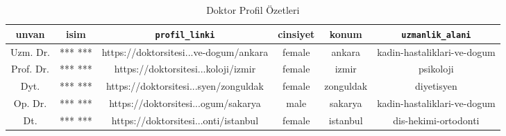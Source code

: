 \begin{table*}
\begin{center}
\caption{Doktor Profil Özetleri}
\begin{tabular}{|c|c|c|c|c|c|}
\toprule
unvan & isim& \verb+profil_linki+ & cinsiyet & konum & \verb+uzmanlik_alani+ \\
\midrule
Uzm. Dr. & *** *** & https://doktorsitesi...ve-dogum/ankara & female & ankara & kadin-hastaliklari-ve-dogum \\
\midrule
Prof. Dr. & *** *** & https://doktorsitesi...koloji/izmir & female & izmir & psikoloji \\
\midrule
Dyt. & *** *** & https://doktorsitesi...syen/zonguldak & female & zonguldak & diyetisyen \\
\midrule
Op. Dr. & *** *** & https://doktorsitesi...ogum/sakarya & male & sakarya & kadin-hastaliklari-ve-dogum \\
\midrule
Dt. & *** *** & https://doktorsitesi...onti/istanbul & female & istanbul & dis-hekimi-ortodonti \\
\bottomrule
\end{tabular}
\end{center}
\end{table*}